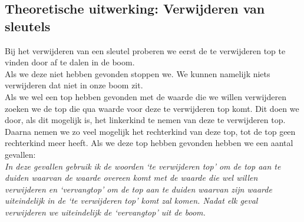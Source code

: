 \documentclass[11pt,a4paper]{report}
\begin{document}
\subsection{Theoretische uitwerking: Verwijderen van sleutels}
Bij het verwijderen van een sleutel proberen we eerst de te verwijderen top te vinden door af te dalen in de boom. \\
Als we deze niet hebben gevonden stoppen we. We kunnen namelijk niets verwijderen dat niet in onze boom zit.\\
Als we wel een top hebben gevonden met de waarde die we willen verwijderen zoeken we de top die qua waarde voor deze te verwijderen top komt. Dit doen we door, als dit mogelijk is, het linkerkind te nemen van deze te verwijderen top. Daarna nemen we zo veel mogelijk het rechterkind van deze top, tot de top geen rechterkind meer heeft. Als we deze top hebben gevonden hebben we een aantal gevallen:\\

\textit{In deze gevallen gebruik ik de woorden `te verwijderen top' om de top aan te duiden waarvan de waarde overeen komt met de waarde die wel willen verwijderen en `vervangtop' om de top aan te duiden waarvan zijn waarde uiteindelijk in de `te verwijderen top' komt zal komen. Nadat elk geval verwijderen we uiteindelijk de `vervangtop' uit de boom.}
\end{document}
